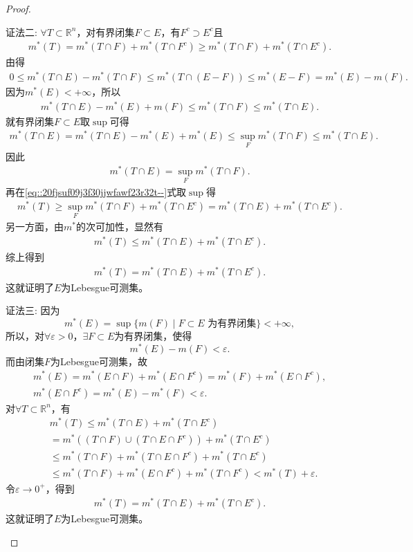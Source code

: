 \documentclass[../../main.tex]{subfiles}%
\begin{document}
\begin{proof}
\begin{enumerate}[(1)]
{\color{blue}证法二:} $\forall T\subset\mathbb{R}^n$，对有界闭集$F\subset E$，有$F^c\supset E^c$且
\begin{align}
m^*(T) = m^*(T\cap F)+m^*(T\cap F^c) \geqslant m^*(T\cap F)+m^*(T\cap E^c). \label{eq::20fjsuf09j3f30jjwfawf23r32t--}
\end{align}
由得
\begin{align*}
0\leqslant m^*(T\cap E)-m^*(T\cap F) \leqslant m^*(T\cap (E-F)) \leqslant m^*(E-F) 
 = m^*(E)-m(F).
\end{align*}
因为$m^*(E)<+\infty$，所以
\begin{align*}
m^*(T\cap E)-m^*(E)+m(F) \leqslant m^*(T\cap F) \leqslant m^*(T\cap E).
\end{align*}
就有界闭集$F\subset E$取$\sup$可得
\begin{align*}
m^*(T\cap E) = m^*(T\cap E)-m^*(E)+m^*(E) \leqslant \sup_F m^*(T\cap F) \leqslant m^*(T\cap E).
\end{align*}
因此
\begin{align*}
m^*(T\cap E) = \sup_F m^*(T\cap F).
\end{align*}
再在\eqref{eq::20fjsuf09j3f30jjwfawf23r32t--}式取$\sup$得
\begin{align*}
m^*(T) \geqslant \sup_F m^*(T\cap F)+m^*(T\cap E^c) = m^*(T\cap E)+m^*(T\cap E^c).
\end{align*}
另一方面，由$m^*$的次可加性，显然有
\begin{align*}
m^*(T) \leqslant m^*(T\cap E)+m^*(T\cap E^c).
\end{align*}
综上得到
\begin{align*}
m^*(T) = m^*(T\cap E)+m^*(T\cap E^c).
\end{align*}
这就证明了$E$为Lebesgue可测集。

{\color{blue}证法三:} 因为
\[
m^*(E) = \sup\{m(F) \mid F\subset E\text{ 为有界闭集}\}<+\infty,
\]
所以，对$\forall\varepsilon>0$，$\exists F\subset E$为有界闭集，使得
\[
m^*(E)-m(F)<\varepsilon.
\]
而由闭集$F$为Lebesgue可测集，故
\begin{gather*}
m^*(E) = m^*(E\cap F)+m^*(E\cap F^c) = m^*(F)+m^*(E\cap F^c), \\
m^*(E\cap F^c) = m^*(E)-m^*(F) < \varepsilon.
\end{gather*}
对$\forall T\subset\mathbb{R}^n$，有
\begin{align*}
&m^*(T) \leqslant m^*(T\cap E)+m^*(T\cap E^c) \\
&= m^*((T\cap F)\cup(T\cap E\cap F^c))+m^*(T\cap E^c) \\
&\leqslant m^*(T\cap F)+m^*(T\cap E\cap F^c)+m^*(T\cap E^c) \\
&\leqslant m^*(T\cap F)+m^*(E\cap F^c)+m^*(T\cap F^c) < m^*(T)+\varepsilon.
\end{align*}
令$\varepsilon\to 0^+$，得到
\begin{align*}
m^*(T) = m^*(T\cap E)+m^*(T\cap E^c).
\end{align*}
这就证明了$E$为Lebesgue可测集。


\end{enumerate}
\end{proof}
\end{document}

